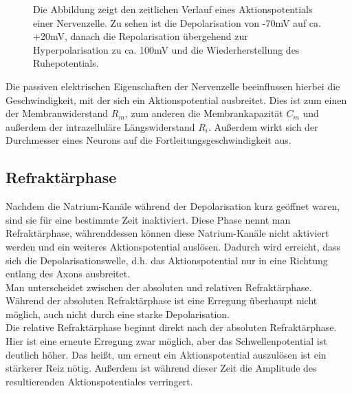 \documentclass[11pt]{article}
\begin{document}
\begin{figure}[H]
\caption{Die Abbildung zeigt den zeitlichen Verlauf eines Aktionspotentials einer Nervenzelle. Zu sehen ist die Depolarisation von -70mV auf ca. +20mV, danach die Repolarisation übergehend zur Hyperpolarisation zu ca. 100mV und die Wiederherstellung des Ruhepotentials.  }
\label{ap}
\end{figure}

Die passiven elektrischen Eigenschaften der Nervenzelle beeinflussen hierbei die Geschwindigkeit, mit der sich ein Aktionspotential ausbreitet. Dies ist zum einen der Membranwiderstand $R_m$, zum anderen die Membrankapazität $C_m$ und außerdem der intrazelluläre Längswiderstand $R_i$. Außerdem wirkt sich der Durchmesser eines Neurons auf die Fortleitungsgeschwindigkeit aus.  \cite{haustiere} 

\subsection{Refraktärphase}
Nachdem die Natrium-Kanäle während der Depolarisation kurz geöffnet waren, sind sie für eine bestimmte Zeit inaktiviert. Diese Phase nennt man Refraktärphase, währenddessen können diese Natrium-Kanäle nicht aktiviert werden und ein weiteres Aktionspotential auslösen. Dadurch wird erreicht, dass sich die Depolarisationswelle, d.h. das Aktionspotential nur in eine Richtung entlang des Axons ausbreitet.  \cite{zellbiologie} \\
Man unterscheidet zwischen der absoluten und relativen Refraktärphase. Während der absoluten Refraktärphase ist eine Erregung überhaupt nicht möglich, auch nicht durch eine starke Depolarisation. \\
Die relative Refraktärphase beginnt direkt nach der absoluten Refraktärphase. Hier ist eine erneute Erregung zwar möglich, aber das Schwellenpotential ist deutlich höher. Das heißt, um erneut ein Aktionspotential auszulösen ist ein stärkerer Reiz nötig. Außerdem ist während dieser Zeit die Amplitude des resultierenden Aktionspotentiales verringert. \cite{physiologie}
\end{document}
